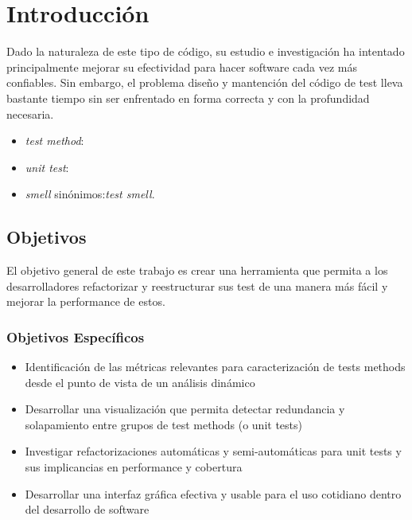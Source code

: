 \chapter{Introducción} 
\par 
Dado la naturaleza de este tipo de código, su estudio e investigación ha intentado principalmente mejorar su efectividad para hacer software cada vez más confiables. Sin embargo, el problema diseño y mantención del código de test lleva bastante tiempo sin ser enfrentado en forma correcta y con la profundidad necesaria. 



\begin{itemize}
\item \emph{test method}:
\item \emph{unit test}:
\item \emph{smell} sinónimos:\emph{test smell}.
\end{itemize}





\section{Objetivos}
\par El objetivo general de este trabajo es crear una herramienta que permita a los desarrolladores refactorizar y reestructurar sus test de una manera más fácil y mejorar la performance de estos.

\subsection*{Objetivos Específicos}
\begin{itemize}
\item Identificación de las métricas relevantes para caracterización de tests methods desde el punto de vista de un análisis dinámico
\item Desarrollar una visualización que permita detectar redundancia y solapamiento entre grupos de test methods (o unit tests)
\item Investigar refactorizaciones automáticas y semi-automáticas para unit tests y sus implicancias en performance y cobertura
\item Desarrollar una interfaz gráfica efectiva y usable para el uso cotidiano dentro del desarrollo de software
\end{itemize}

